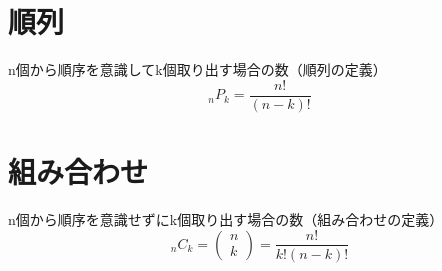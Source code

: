 \documentclass[fleqn,leqno,autodetect-engine,dvipdfmx-if-dvi,ja=standard]{bxjsarticle}
\begin{document}
\section{順列}

n個から順序を意識してk個取り出す場合の数（順列の定義）
\[ {}_n P _k  =  \frac{n!}{(n-k)!} \]

\section{組み合わせ}

n個から順序を意識せずにk個取り出す場合の数（組み合わせの定義）
\[ {}_n C _k = \left(
               \begin{array}{c}
                 n \\
                 k 
	       \end{array}
               \right) = \frac{n!}{k!(n-k)!}  
\]
\end{document}
